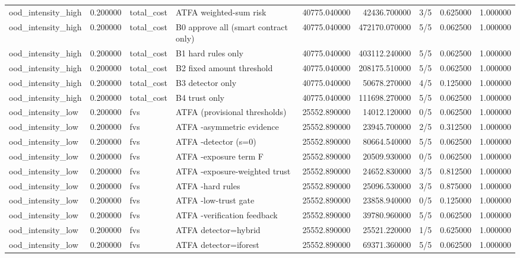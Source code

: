 \begin{tabular}{lrllrrlrr}
ood\_intensity\_high & 0.200000 & total\_cost & ATFA weighted-sum risk & 40775.040000 & 42436.700000 & 3/5 & 0.625000 & 1.000000 \\
ood\_intensity\_high & 0.200000 & total\_cost & B0 approve all (smart contract only) & 40775.040000 & 472170.070000 & 5/5 & 0.062500 & 1.000000 \\
ood\_intensity\_high & 0.200000 & total\_cost & B1 hard rules only & 40775.040000 & 403112.240000 & 5/5 & 0.062500 & 1.000000 \\
ood\_intensity\_high & 0.200000 & total\_cost & B2 fixed amount threshold & 40775.040000 & 208175.510000 & 5/5 & 0.062500 & 1.000000 \\
ood\_intensity\_high & 0.200000 & total\_cost & B3 detector only & 40775.040000 & 50678.270000 & 4/5 & 0.125000 & 1.000000 \\
ood\_intensity\_high & 0.200000 & total\_cost & B4 trust only & 40775.040000 & 111698.270000 & 5/5 & 0.062500 & 1.000000 \\
ood\_intensity\_low & 0.200000 & fvs & ATFA (provisional thresholds) & 25552.890000 & 14012.120000 & 0/5 & 0.062500 & 1.000000 \\
ood\_intensity\_low & 0.200000 & fvs & ATFA -asymmetric evidence & 25552.890000 & 23945.700000 & 2/5 & 0.312500 & 1.000000 \\
ood\_intensity\_low & 0.200000 & fvs & ATFA -detector (s=0) & 25552.890000 & 80664.540000 & 5/5 & 0.062500 & 1.000000 \\
ood\_intensity\_low & 0.200000 & fvs & ATFA -exposure term F & 25552.890000 & 20509.930000 & 0/5 & 0.062500 & 1.000000 \\
ood\_intensity\_low & 0.200000 & fvs & ATFA -exposure-weighted trust & 25552.890000 & 24652.830000 & 3/5 & 0.812500 & 1.000000 \\
ood\_intensity\_low & 0.200000 & fvs & ATFA -hard rules & 25552.890000 & 25096.530000 & 3/5 & 0.875000 & 1.000000 \\
ood\_intensity\_low & 0.200000 & fvs & ATFA -low-trust gate & 25552.890000 & 23858.940000 & 0/5 & 0.125000 & 1.000000 \\
ood\_intensity\_low & 0.200000 & fvs & ATFA -verification feedback & 25552.890000 & 39780.960000 & 5/5 & 0.062500 & 1.000000 \\
ood\_intensity\_low & 0.200000 & fvs & ATFA detector=hybrid & 25552.890000 & 25521.220000 & 1/5 & 0.625000 & 1.000000 \\
ood\_intensity\_low & 0.200000 & fvs & ATFA detector=iforest & 25552.890000 & 69371.360000 & 5/5 & 0.062500 & 1.000000 \\

\end{tabular}
